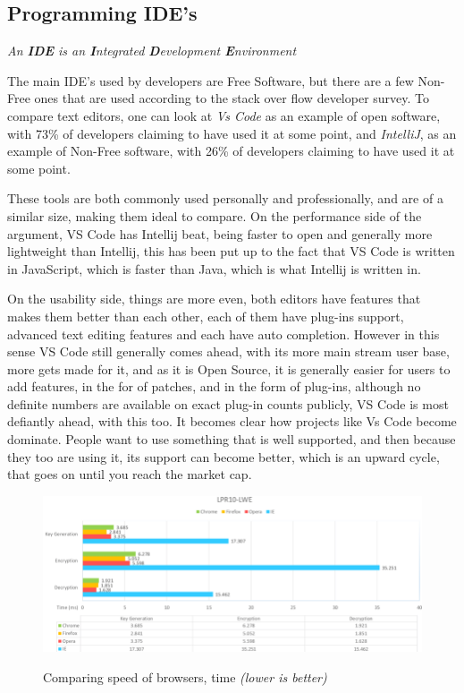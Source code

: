 \documentclass[a4paper,12pt]{article}
\begin{document}
{\subsection{Programming IDE's} 
\textit{An \textbf{IDE} is an \textbf{I}ntegrated \textbf{D}evelopment \textbf{E}nvironment}

The main IDE's used by developers are Free Software, but there are a few Non-Free ones that are used according to
the stack over flow developer survey\cite{IDEusage}.  To compare text editors, one can look at \textit{Vs Code} as
an example of open software, with 73\% of developers claiming to have used it at some point, and \textit{IntelliJ},
as an example of Non-Free software, with 26\% of developers claiming to have used it at some point\cite{IDEusage}.

These tools are both commonly used personally and professionally, and are of a similar size, making them ideal to
compare. On the performance side of the argument, VS Code has Intellij beat, being faster to open and generally
more lightweight than Intellij, this has been put up to the fact that VS Code is written in JavaScript, which is
faster than Java, which is what Intellij is written in\cite{VSCODEvsintellij}.

On the usability side, things are more even, both editors have features that makes them better than each other,
each of them have plug-ins support, advanced text editing features and each have auto completion. However in this
sense VS Code still generally comes ahead, with its more main stream user base, more gets made for it, and as it is
Open Source, it is generally easier for users to add features, in the for of patches, and in the form of plug-ins,
although no definite numbers are available on exact plug-in counts publicly, VS Code is most defiantly ahead,
with this too.	It becomes clear how projects like Vs Code become dominate. People want to use something that is
well supported, and then because they too are using it, its support can become better, which is an upward cycle,
that goes on until you reach the market cap.

\begin{figure}[h]
	\caption{Comparing speed of browsers, time \textit{(lower is better)}}
	\includegraphics[width=\textwidth]{webbrowserperfomace.png} 
	\label{fig:graph}
\end{figure}

}
\end{document}
